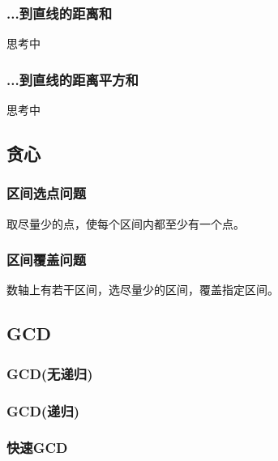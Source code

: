 \documentclass[a4paper]{article}
\begin{document}
\begin{CJK*}{UTF8}{gbsn}
\begin{multicols}{3}
\begin{flushleft}
\subsubsection{...到直线的距离和}
思考中\\


\subsubsection{...到直线的距离平方和}
思考中\\



\subsection{贪心}

\subsubsection{区间选点问题}
取尽量少的点，使每个区间内都至少有一个点。\\

\subsubsection{区间覆盖问题}
数轴上有若干区间，选尽量少的区间，覆盖指定区间。\\


\subsection{GCD}


\subsubsection{GCD(无递归)}




\subsubsection{GCD(递归)}


\subsubsection{快速GCD}



\end{flushleft}
\end{multicols}
\end{CJK*}
\end{document}

